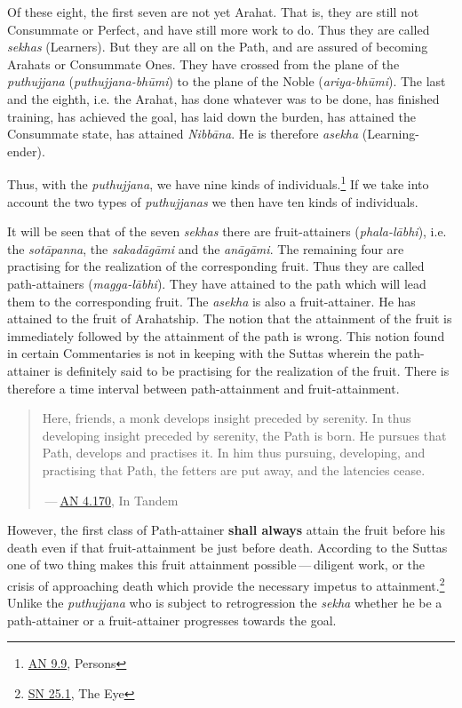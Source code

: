Of these eight, the first seven are not yet Arahat. That is, they are still not Consummate or Perfect, and have still more work to do. Thus they are called \emph{sekhas} (Learners). But they are all on the Path, and are assured of becoming Arahats or Consummate Ones. They have crossed from the plane of the \emph{puthujjana} (\emph{puthujjana-bhūmi}) to the plane of the Noble (\emph{ariya-bhūmi}). The last and the eighth, i.e. the Arahat, has done whatever was to be done, has finished training, has achieved the goal, has laid down the burden, has attained the Consummate state, has attained \emph{Nibbāna}. He is therefore \emph{asekha} (Learning-ender).

Thus, with the \emph{puthujjana}, we have nine kinds of individuals.\footnote{\href{https://suttacentral.net/an9.9/en/sujato}{AN 9.9}, Persons} If we take into account the two types of \emph{puthujjanas} we then have ten kinds of individuals.

It will be seen that of the seven \emph{sekhas} there are fruit-attainers (\emph{phala-lābhi}), i.e. the \emph{sotāpanna}, the \emph{sakadāgāmi} and the \emph{anāgāmi}. The remaining four are practising for the realization of the corresponding fruit. Thus they are called path-attainers (\emph{magga-lābhi}). They have attained to the path which will lead them to the corresponding fruit. The \emph{asekha} is also a fruit-attainer. He has attained to the fruit of Arahatship. The notion that the attainment of the fruit is immediately followed by the attainment of the path is wrong. This notion found in certain Commentaries is not in keeping with the Suttas wherein the path-attainer is definitely said to be practising for the realization of the fruit. There is therefore a time interval between path-attainment and fruit-attainment.

\begin{quote}
Here, friends, a monk develops insight preceded by serenity. In thus developing insight preceded by serenity, the Path is born. He pursues that Path, develops and practises it. In him thus pursuing, developing, and practising that Path, the fetters are put away, and the latencies cease.

 --- \href{https://suttacentral.net/an4.170/en/thanissaro}{AN 4.170}, In Tandem
\end{quote}

However, the first class of Path-attainer \textbf{shall always} attain the fruit before his death even if that fruit-attainment be just before death. According to the Suttas one of two thing makes this fruit attainment possible --- diligent work, or the crisis of approaching death which provide the necessary impetus to attainment.\footnote{\href{https://suttacentral.net/sn25.1/en/sujato}{SN 25.1}, The Eye} Unlike the \emph{puthujjana} who is subject to retrogression the \emph{sekha} whether he be a path-attainer or a fruit-attainer progresses towards the goal.

